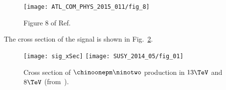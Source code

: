 \begin{figure}
  \centering
  \texttt{[image: ATL\_COM\_PHYS\_2015\_011/fig\_8]}
  \caption{Figure 8 of Ref.~\cite{Grout:1981548}}
\label{fig_run1_sen2}
\end{figure}




The cross section of the signal is shown in Fig.~\ref{fig_sig_xsec}.
\begin{figure}
  \centering
  \texttt{[image: sig\_xSec]}
  \texttt{[image: SUSY\_2014\_05/fig\_01]}
  \caption{Cross section of $\chinoonepm\ninotwo$ production in $13\TeV$ and $8\TeV$ (from~\cite{Aad:2015eda}).}
  \label{fig_sig_xsec}
\end{figure}

